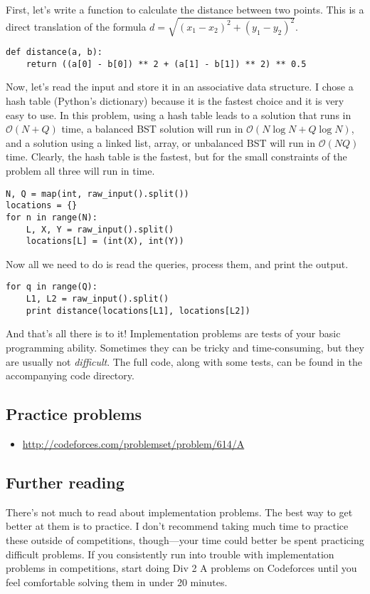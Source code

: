 First, let's write a function to calculate the distance between two points. This is a direct translation of the formula $d = \sqrt{(x_1 - x_2)^2 + (y_1 - y_2)^2}$.

\begin{verbatim}
def distance(a, b):
    return ((a[0] - b[0]) ** 2 + (a[1] - b[1]) ** 2) ** 0.5
\end{verbatim}

Now, let's read the input and store it in an associative data structure. I chose a hash table (Python's dictionary) because it is the fastest choice and it is very easy to use. In this problem, using a hash table leads to a solution that runs in $\mathcal{O}(N + Q)$ time, a balanced BST solution will run in $\mathcal{O}(N \log N + Q \log N)$, and a solution using a linked list, array, or unbalanced BST will run in $\mathcal{O}(NQ)$ time. Clearly, the hash table is the fastest, but for the small constraints of the problem all three will run in time.

\begin{verbatim}
N, Q = map(int, raw_input().split())
locations = {}
for n in range(N):
    L, X, Y = raw_input().split()
    locations[L] = (int(X), int(Y))
\end{verbatim}

Now all we need to do is read the queries, process them, and print the output.

\begin{verbatim}
for q in range(Q):
    L1, L2 = raw_input().split()
    print distance(locations[L1], locations[L2])
\end{verbatim}

And that's all there is to it! Implementation problems are tests of your basic programming ability. Sometimes they can be tricky and time-consuming, but they are usually not \textit{difficult}. The full code, along with some tests, can be found in the accompanying code directory.

\subsection*{Practice problems}

\begin{itemize}
\item \url{http://codeforces.com/problemset/problem/614/A}
\end{itemize}

\subsection*{Further reading}

There's not much to read about implementation problems. The best way to get better at them is to practice. I don't recommend taking much time to practice these outside of competitions, though---your time could better be spent practicing difficult problems. If you consistently run into trouble with implementation problems in competitions, start doing Div 2 A problems on Codeforces until you feel comfortable solving them in under 20 minutes.
